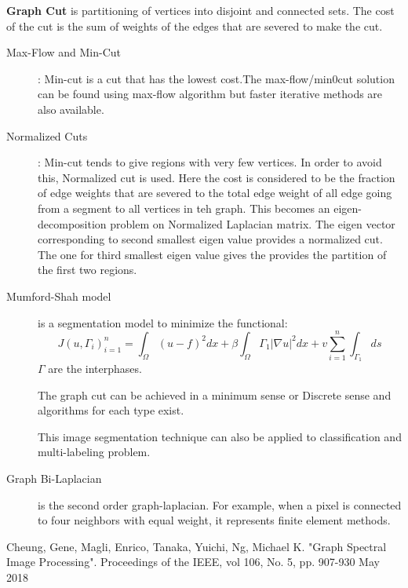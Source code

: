 \documentclass[10pt,a4paper, nocenter]{report}
\begin{document}
\begin{description}
		\textbf{Graph Cut} is partitioning of vertices into disjoint and connected sets. The cost of the cut is the sum of weights of the edges that are severed to make the cut.
		
		\begin{description}
			\item[Max-Flow and Min-Cut]: Min-cut is a cut that has the lowest cost.The max-flow/min0cut solution can be found using max-flow algorithm but faster iterative methods are also available. 
			
			\item[Normalized Cuts]: Min-cut tends to give regions with very few vertices. In order to avoid this, Normalized cut is used. Here the cost is considered to be the fraction of edge weights that are severed to the total edge weight of all edge going from a segment to all vertices in teh graph. This becomes an eigen-decomposition problem on Normalized Laplacian matrix. The eigen vector corresponding to second smallest eigen value provides a normalized cut. The one for third smallest eigen value gives the provides the partition of the first two regions.
			
			
			\item[Mumford-Shah model] is a segmentation model to minimize the functional: $$ J(u, \Gamma_{i})_{i=1}^n = \int_{\Omega}(u-f)^2 dx + \beta \int_{\Omega}\Gamma_{1}\lvert \nabla u \rvert ^2dx + v\sum_{i=1}^{n}\int_{\Gamma_{1}}ds$$ $\Gamma$ are the interphases. 
			
			The graph cut can be achieved in a minimum sense or Discrete sense and algorithms for each type exist. 
			
			This image segmentation technique can also be applied to classification and multi-labeling problem. 
			
			\item[Graph Bi-Laplacian] is the second order graph-laplacian. For example, when a pixel is connected to four neighbors with equal weight, it represents finite element methods. 
		\end{description}
		
	\end{description}
	
	\thispagestyle{fancy}
	\begin{thebibliography}{9}
	\thispagestyle{fancy}
		Cheung, Gene, Magli, Enrico, Tanaka, Yuichi, Ng, Michael K. "Graph Spectral Image Processing". Proceedings of the IEEE, vol 106, No. 5, pp. 907-930 May 2018

	\end{thebibliography}
\end{document}
